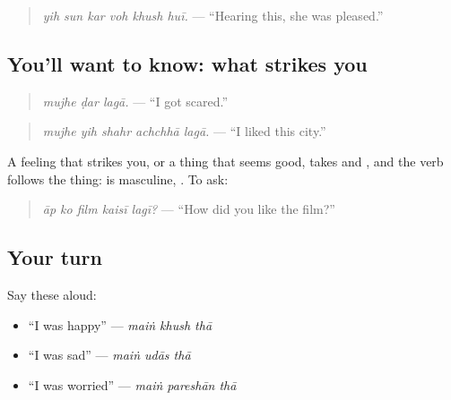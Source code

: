 \begin{quote}
\emph{yih sun kar voh khush huī.} — \textquotedblleft{}Hearing this, she was pleased.\textquotedblright{}
\end{quote}

\subsection*{You'll want to know: what strikes you}
\begin{quote}
\textbf{  }
\end{quote}

\begin{quote}
\emph{mujhe ḍar lagā.} — \textquotedblleft{}I got scared.\textquotedblright{}
\end{quote}

\begin{quote}
\textbf{    }
\end{quote}

\begin{quote}
\emph{mujhe yih shahr achchhā lagā.} — \textquotedblleft{}I liked this city.\textquotedblright{}
\end{quote}

A feeling that strikes you, or a thing that seems good, takes \textbf{} and \textbf{}, and the verb follows the thing: \textbf{} is masculine, \textbf{ }. To ask:

\begin{quote}
\textbf{    }
\end{quote}

\begin{quote}
\emph{āp ko film kaisī lagī?} — \textquotedblleft{}How did you like the film?\textquotedblright{}
\end{quote}

\subsection*{Your turn}
Say these aloud:

\begin{itemize}
\raggedright
  \item \textquotedblleft{}I was happy\textquotedblright{} — \emph{maiṅ khush thā}
  \item \textquotedblleft{}I was sad\textquotedblright{} — \emph{maiṅ udās thā}
  \item \textquotedblleft{}I was worried\textquotedblright{} — \emph{maiṅ pareshān thā}
\end{itemize}

